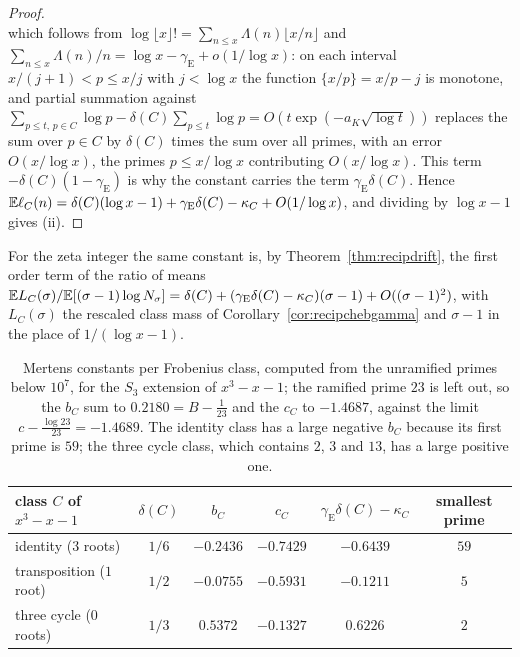 \begin{proof}
\[\]
which follows from $\log\lfloor x\rfloor!=\sum_{n\le x}\Lambda(n)\lfloor x/n\rfloor$ and $\sum_{n\le x}\Lambda(n)/n=\log x-\gamma_{\mathrm E}+o(1/\log x)$: on each interval $x/(j+1)<p\le x/j$ with $j<\log x$ the function $\{x/p\}=x/p-j$ is monotone, and partial summation against $\sum_{p\le t,\,p\in C}\log p-\delta(C)\sum_{p\le t}\log p=O(t\exp(-a_K\sqrt{\log t}))$ replaces the sum over $p\in C$ by $\delta(C)$ times the sum over all primes, with an error $O(x/\log x)$, the primes $p\le x/\log x$ contributing $O(x/\log x)$. This term $-\delta(C)(1-\gamma_{\mathrm E})$ is why the constant carries the term $\gamma_{\mathrm E}\delta(C)$. Hence $\mathbb{E}\ell_C(n)=\delta(C)(\log x-1)+\gamma_{\mathrm E}\delta(C)-\kappa_C+O(1/\log x)$, and dividing by $\log x-1$ gives (ii).
\end{proof}

For the zeta integer the same constant is, by Theorem~\ref{thm:recipdrift}, the first order term of the ratio of means $\mathbb{E} L_C(\sigma)/\mathbb{E}[(\sigma-1)\log N_\sigma]=\delta(C)+(\gamma_{\mathrm E}\delta(C)-\kappa_C)(\sigma-1)+O((\sigma-1)^2)$, with $L_C(\sigma)$ the rescaled class mass of Corollary~\ref{cor:recipchebgamma} and $\sigma-1$ in the place of $1/(\log x-1)$.

\begin{table}[!htbp]
\centering\small
\begin{tabular}{@{}lccccc@{}}
\toprule
class $C$ of $x^3-x-1$ & $\delta(C)$ & $b_C$ & $c_C$ & $\gamma_{\mathrm E}\delta(C)-\kappa_C$ & smallest prime\\
\midrule
identity ($3$ roots) & $1/6$ & $-0.2436$ & $-0.7429$ & $-0.6439$ & $59$\\
transposition ($1$ root) & $1/2$ & $-0.0755$ & $-0.5931$ & $-0.1211$ & $5$\\
three cycle ($0$ roots) & $1/3$ & $0.5372$ & $-0.1327$ & $0.6226$ & $2$\\
\bottomrule
\end{tabular}
\caption{Mertens constants per Frobenius class, computed from the unramified primes below $10^7$, for the $S_3$ extension of $x^3-x-1$; the ramified prime $23$ is left out, so the $b_C$ sum to $0.2180=B-\frac1{23}$ and the $c_C$ to $-1.4687$, against the limit $c-\frac{\log23}{23}=-1.4689$. The identity class has a large negative $b_C$ because its first prime is $59$; the three cycle class, which contains $2$, $3$ and $13$, has a large positive one.}\label{tab:pdmertens}
\end{table}

